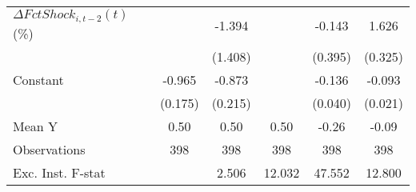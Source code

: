 {\begin{tabular}{l*{5}{c}}
\addlinespace
$ \Delta FctShock_{i,t-2}(t)$ (\%)&                     &      -1.394         &                     &      -0.143         &       1.626\sym{***}\\
                    &                     &     (1.408)         &                     &     (0.395)         &     (0.325)         \\
\addlinespace
Constant            &      -0.965\sym{***}&      -0.873\sym{***}&                     &      -0.136\sym{***}&      -0.093\sym{***}\\
                    &     (0.175)         &     (0.215)         &                     &     (0.040)         &     (0.021)         \\
\midrule
Mean Y              &        0.50         &        0.50         &        0.50         &       -0.26         &       -0.09         \\
Observations        &         398         &         398         &         398         &         398         &         398         \\
Exc. Inst. F-stat   &                     &       2.506         &      12.032         &      47.552         &      12.800         \\
\bottomrule
\end{tabular}
}
